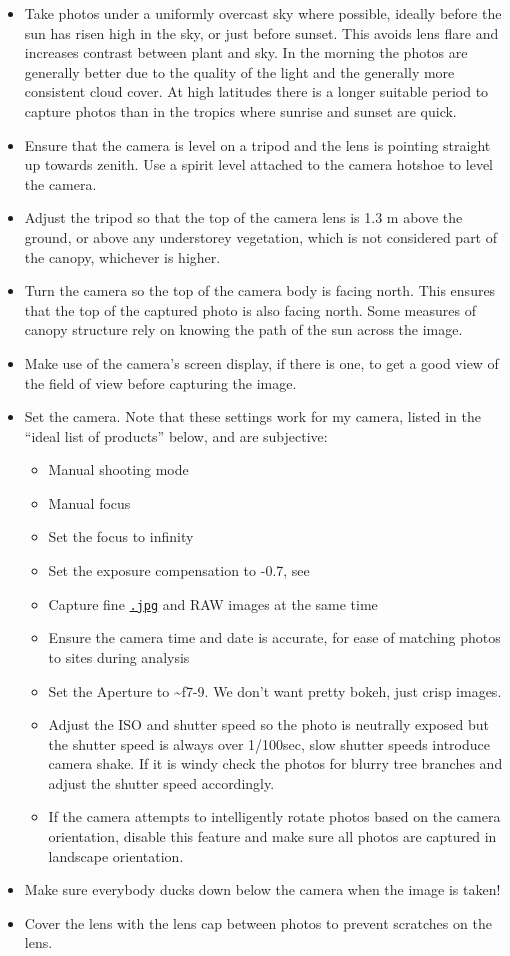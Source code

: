 \documentclass[11pt,a4paper]{article}
\newcommand\file[1]{\texttt{\underline{#1}}}  %
\begin{document}
\begin{itemize}
	\item{Take photos under a uniformly overcast sky where possible, ideally before the sun has risen high in the sky, or just before sunset. This avoids lens flare and increases contrast between plant and sky. In the morning the photos are generally better due to the quality of the light and the generally more consistent cloud cover. At high latitudes there is a longer suitable period to capture photos than in the tropics where sunrise and sunset are quick.}
	\item{Ensure that the camera is level on a tripod and the lens is pointing straight up towards zenith. Use a spirit level attached to the camera hotshoe to level the camera.}
	\item{Adjust the tripod so that the top of the camera lens is 1.3 m above the ground, or above any understorey vegetation, which is not considered part of the canopy, whichever is higher.} 
	\item{Turn the camera so the top of the camera body is facing north. This ensures that the top of the captured photo is also facing north. Some measures of canopy structure rely on knowing the path of the sun across the image.}
	\item{Make use of the camera's screen display, if there is one, to get a good view of the field of view before capturing the image.}
	\item{Set the camera. Note that these settings work for my camera, listed in the  
		``ideal list of products'' below, and are subjective:}
		\begin{itemize}
			\item{Manual shooting mode}
			\item{Manual focus}
			\item{Set the focus to infinity}
			\item{Set the exposure compensation to -0.7, see \citet{Zhang2005}}
			\item{Capture fine \file{.jpg} and RAW images at the same time}
			\item{Ensure the camera time and date is accurate, for ease of matching photos to sites during analysis}
			\item{Set the Aperture to \textasciitilde{}f7-9. We don't want pretty bokeh, just crisp images.}
			\item{Adjust the ISO and shutter speed so the photo is neutrally exposed but the shutter speed is always over 1/100sec, slow shutter speeds introduce camera shake. If it is windy check the photos for blurry tree branches and adjust the shutter speed accordingly.}
			\item{If the camera attempts to intelligently rotate photos based on the camera orientation, disable this feature and make sure all photos are captured in landscape orientation.}
		\end{itemize}
	\item{Make sure everybody ducks down below the camera when the image is taken!}
	\item{Cover the lens with the lens cap between photos to prevent scratches on the lens.}
\end{itemize}
\end{document}
